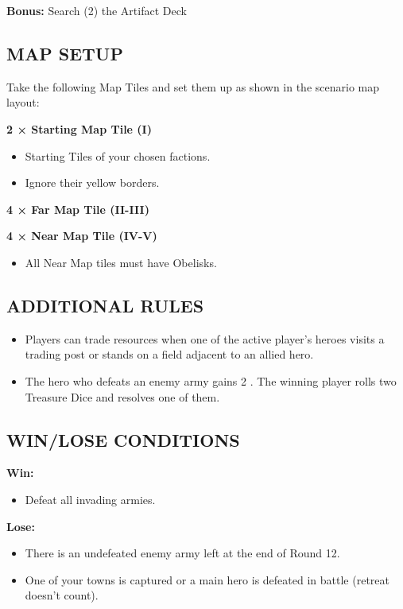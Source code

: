 \begin{multicols*}{2}
\textbf{Bonus:} Search (2) the Artifact Deck

\subsection*{\MakeUppercase{Map Setup}}

Take the following Map Tiles and set them up as shown in the scenario map layout:

\textbf{2 × Starting Map Tile (I)}
\begin{itemize}
  \item Starting Tiles of your chosen factions.
  \item Ignore their yellow borders.
\end{itemize}

\textbf{4 × Far Map Tile (II-III)}

\textbf{4 × Near Map Tile (IV-V)}
\begin{itemize}
  \item All Near Map tiles must have Obelisks.
\end{itemize}

\subsection*{\MakeUppercase{Additional rules}}

\begin{itemize}
  \item Players can trade resources when one of the active player's heroes visits a trading post or stands on a field adjacent to an allied hero.
  \item The hero who defeats an enemy army gains 2 .
    The winning player rolls two Treasure Dice and resolves one of them.
\end{itemize}

\subsection*{\MakeUppercase{Win/lose conditions}}

\textbf{Win:}
\begin{itemize}
  \item Defeat all invading armies.
\end{itemize}

\textbf{Lose:}
\begin{itemize}
  \item There is an undefeated enemy army left at the end of Round 12.
  \item One of your towns is captured or a main hero is defeated in battle 
  (retreat doesn't count).
\end{itemize}


\end{multicols*}
